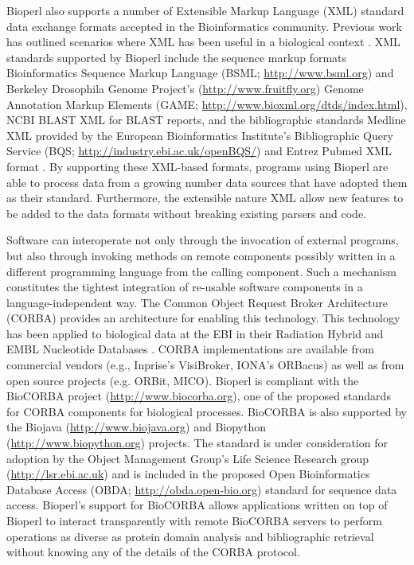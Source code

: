 \documentclass[12pt]{article}
\begin{document}
Bioperl also supports a number of Extensible Markup Language (XML)
standard data exchange formats accepted in the Bioinformatics
community.  Previous work has outlined scenarios where XML has been
useful in a biological context \cite{xmlbioinformatics}.  XML
standards supported by Bioperl include the sequence markup formats
Bioinformatics Sequence Markup Language (BSML;
\url{http://www.bsml.org}) and Berkeley Drosophila Genome Project's
(\url{http://www.fruitfly.org}) Genome Annotation Markup Elements
(GAME; \url{http://www.bioxml.org/dtds/index.html}), NCBI BLAST XML
for BLAST reports, and the bibliographic standards Medline XML
provided by the European Bioinformatics Institute's Bibliographic
Query Service (BQS; \url{http://industry.ebi.ac.uk/openBQS/}) and
Entrez Pubmed XML format \cite{entrez}.  By supporting these XML-based
formats, programs using Bioperl are able to process data from a
growing number data sources that have adopted them as their standard.
Furthermore, the extensible nature XML allow new features to be added
to the data formats without breaking existing parsers and code.

Software can interoperate not only through the invocation of external
programs, but also through invoking methods on remote components
possibly written in a different programming language from the calling
component.  Such a mechanism constitutes the tightest integration of
re-usable software components in a language-independent way.  The
Common Object Request Broker Architecture (CORBA) \cite{corba}
provides an architecture for enabling this technology.  This
technology has been applied to biological data at the EBI in their
Radiation Hybrid \cite{rhdb} and EMBL Nucleotide Databases
\cite{embl-corba}.  CORBA implementations are available from
commercial vendors (e.g., Inprise's VisiBroker, IONA's ORBacus) as
well as from open source projects (e.g. ORBit, MICO).  Bioperl is
compliant with the BioCORBA project (\url{http://www.biocorba.org}),
one of the proposed standards for CORBA components for biological
processes.  BioCORBA is also supported by the Biojava
(\url{http://www.biojava.org}) and Biopython
(\url{http://www.biopython.org}) projects.  The standard is under
consideration for adoption by the Object Management Group's Life
Science Research group (\url{http://lsr.ebi.ac.uk}) and is included in
the proposed Open Bioinformatics Database Access (OBDA;
\url{http://obda.open-bio.org}) standard for sequence data access.
Bioperl's support for BioCORBA allows applications written on top of
Bioperl to interact transparently with remote BioCORBA servers to
perform operations as diverse as protein domain analysis and
bibliographic retrieval without knowing any of the details of the
CORBA protocol.
\end{document}
